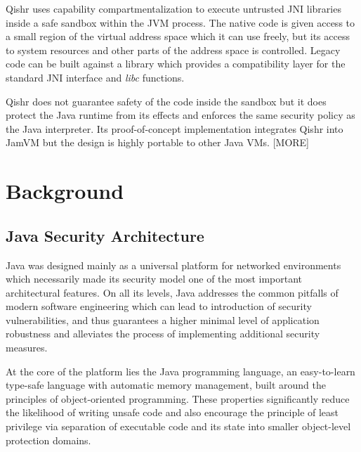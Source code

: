 \documentclass[a4paper,12pt,twoside,openright]{report}
\newcommand{\tool}[1]{\emph{#1}}
\newcommand{\lib}[1]{\tool{lib#1}}
\begin{document}
Qishr uses capability compartmentalization to execute untrusted JNI libraries inside a safe sandbox within the JVM process. The native code is given access to a small region of the virtual address space which it can use freely, but its access to system resources and other parts of the address space is controlled. Legacy code can be built against a library which provides a compatibility layer for the standard JNI interface and \lib{c} functions.

Qishr does not guarantee safety of the code inside the sandbox but it does protect the Java runtime from its effects and enforces the same security policy as the Java interpreter. Its proof-of-concept implementation integrates Qishr into JamVM but the design is highly portable to other Java VMs. [MORE]

\chapter{Background} 

% 

\section{Java Security Architecture}

Java was designed mainly as a universal platform for networked environments which necessarily made its security model one of the most important architectural features. On all its levels, Java addresses the common pitfalls of modern software engineering which can lead to introduction of security vulnerabilities, and thus guarantees a higher minimal level of application robustness and alleviates the process of implementing additional security measures.

At the core of the platform lies the Java programming language, an easy-to-learn type-safe language with automatic memory management, built around the principles of object-oriented programming. These properties significantly reduce the likelihood of writing unsafe code and also encourage the principle of least privilege via separation of executable code and its state into smaller object-level protection domains.
\end{document}
